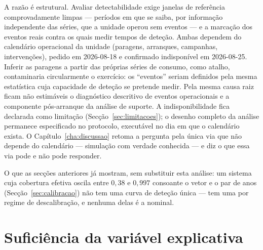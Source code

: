 A razão é estrutural. Avaliar detectabilidade exige janelas de referência
comprovadamente limpas --- períodos em que se saiba, por informação
independente das séries, que a unidade operou sem eventos --- e a marcação
dos eventos reais contra os quais medir tempos de deteção. Ambas dependem do
calendário operacional da unidade (paragens, arranques, campanhas,
intervenções), pedido em 2026-08-18 e confirmado indisponível em 2026-08-25.
Inferir as paragens a partir das próprias séries de consumo, como atalho,
contaminaria circularmente o exercício: os ``eventos'' seriam definidos pela
mesma estatística cuja capacidade de deteção se pretende medir. Pela mesma
causa raiz ficam não estimáveis o diagnóstico descritivo de eventos
operacionais e a componente pós-arranque da análise de suporte. A
indisponibilidade fica declarada como limitação
(Secção~\ref{sec:limitacoes}); o desenho completo da análise permanece
especificado no protocolo, executável no dia em que o calendário exista.
O Capítulo~\ref{cha:discussao} retoma a pergunta pela única via que não
depende do calendário --- simulação com verdade conhecida --- e diz o que
essa via pode e não pode responder.

O que as secções anteriores já mostram, sem substituir esta análise: um sistema cuja
cobertura efetiva oscila entre $0{,}38$ e $0{,}997$ consoante o vetor e o par
de anos (Secção~\ref{sec:calibracao}) não tem uma curva de deteção única
--- tem uma por regime de descalibração, e nenhuma delas é a nominal.


\section{Suficiência da variável explicativa}
\label{sec:suficiencia}


